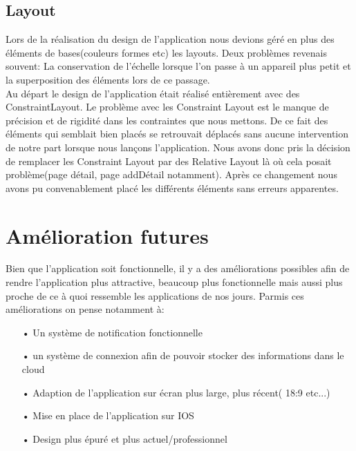 \documentclass[12pt,a4paper]{report}
\begin{document}
\subsection{Layout}
\begin{flushleft}
\justify
Lors de la réalisation du design de l'application nous devions géré en plus des éléments de bases(couleurs formes etc) les layouts. Deux problèmes revenais souvent: La conservation de l'échelle lorsque l'on passe à un appareil plus petit et la superposition des éléments lors de ce passage.\\
Au départ le design de l'application était réalisé entièrement avec des ConstraintLayout. Le problème avec les Constraint Layout est le manque de précision et de rigidité dans les contraintes que nous mettons. De ce fait des éléments qui semblait bien placés se retrouvait déplacés sans aucune intervention de notre part lorsque nous lançons l'application. Nous avons donc pris la décision de remplacer les Constraint Layout par des Relative Layout là où cela posait problème(page détail, page addDétail notamment). Après ce changement nous avons pu convenablement placé les différents éléments sans erreurs apparentes.
\end{flushleft}
\section{Amélioration futures}
Bien que l'application soit fonctionnelle, il y a des améliorations possibles afin de rendre l'application plus attractive, beaucoup plus fonctionnelle mais aussi plus proche de ce à quoi ressemble les applications de nos jours.
Parmis ces améliorations on pense notamment à:
\begin{itemize}
\item[•]Un système de notification fonctionnelle 
\item[•]un système  de connexion afin de pouvoir stocker des informations dans le cloud 
\item[•]Adaption de l'application sur écran plus large, plus récent( 18:9 etc...)
\item[•]Mise en place de l'application sur IOS 
\item[•]Design plus épuré et plus actuel/professionnel 
\end{itemize}

 
\newpage
\end{document}
